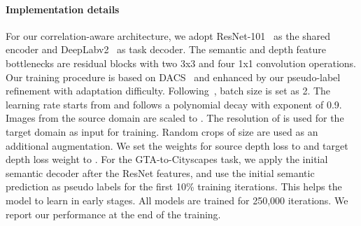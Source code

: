 \documentclass[10pt,twocolumn,letterpaper]{article}
\begin{document}
\paragraph{Implementation details} 
For our correlation-aware architecture, we adopt ResNet-101~\cite{he2016deep}
as the shared encoder and DeepLabv2~\cite{chen2017deeplab} as task decoder. The semantic and depth feature bottlenecks are residual blocks with two 3x3 and four 1x1 convolution operations.  Our training procedure is based on DACS~\cite{tranheden2020dacs} and enhanced by our pseudo-label refinement with adaptation difficulty.
Following~\cite{tranheden2020dacs}, batch size is set as 2. The learning rate starts from  and  follows a polynomial decay with exponent of 0.9. Images from the source domain are scaled to . The resolution of  is used for the target domain as input for training. Random crops of size  are used as an additional augmentation. We set the weights for source depth loss to  and target depth loss weight to . For the GTA-to-Cityscapes task, we apply the initial semantic decoder after the ResNet features, and use the initial semantic prediction as pseudo labels for the first 10\% training iterations. This helps the model to learn in early stages. All models are trained for 250,000 iterations. We report our performance at the end of the training.
\end{document}
